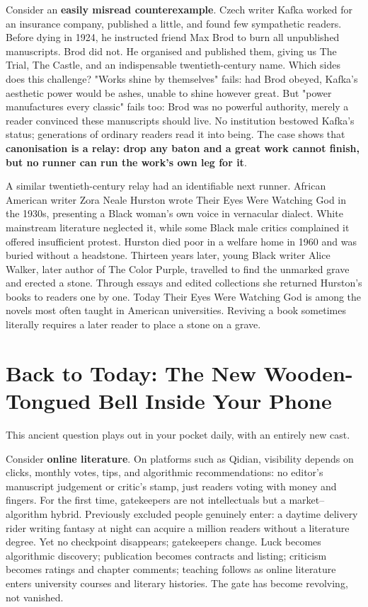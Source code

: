 Consider an \textbf{easily misread counterexample}. Czech writer Kafka worked for an insurance company, published a little, and found few sympathetic readers. Before dying in 1924, he instructed friend Max Brod to burn all unpublished manuscripts. Brod did not. He organised and published them, giving us The Trial, The Castle, and an indispensable twentieth-century name. Which sides does this challenge? "Works shine by themselves" fails: had Brod obeyed, Kafka's aesthetic power would be ashes, unable to shine however great. But "power manufactures every classic" fails too: Brod was no powerful authority, merely a reader convinced these manuscripts should live. No institution bestowed Kafka's status; generations of ordinary readers read it into being. The case shows that \textbf{canonisation is a relay: drop any baton and a great work cannot finish, but no runner can run the work's own leg for it}.

A similar twentieth-century relay had an identifiable next runner. African American writer Zora Neale Hurston wrote Their Eyes Were Watching God in the 1930s, presenting a Black woman's own voice in vernacular dialect. White mainstream literature neglected it, while some Black male critics complained it offered insufficient protest. Hurston died poor in a welfare home in 1960 and was buried without a headstone. Thirteen years later, young Black writer Alice Walker, later author of The Color Purple, travelled to find the unmarked grave and erected a stone. Through essays and edited collections she returned Hurston's books to readers one by one. Today Their Eyes Were Watching God is among the novels most often taught in American universities. Reviving a book sometimes literally requires a later reader to place a stone on a grave.

\section[Today: The New Bell Inside Your Phone]{Back to Today: The New Wooden-Tongued Bell Inside Your Phone}
This ancient question plays out in your pocket daily, with an entirely new cast.

Consider \textbf{online literature}. On platforms such as Qidian, visibility depends on clicks, monthly votes, tips, and algorithmic recommendations: no editor's manuscript judgement or critic's stamp, just readers voting with money and fingers. For the first time, gatekeepers are not intellectuals but a market--algorithm hybrid. Previously excluded people genuinely enter: a daytime delivery rider writing fantasy at night can acquire a million readers without a literature degree. Yet no checkpoint disappears; gatekeepers change. Luck becomes algorithmic discovery; publication becomes contracts and listing; criticism becomes ratings and chapter comments; teaching follows as online literature enters university courses and literary histories. The gate has become revolving, not vanished.

